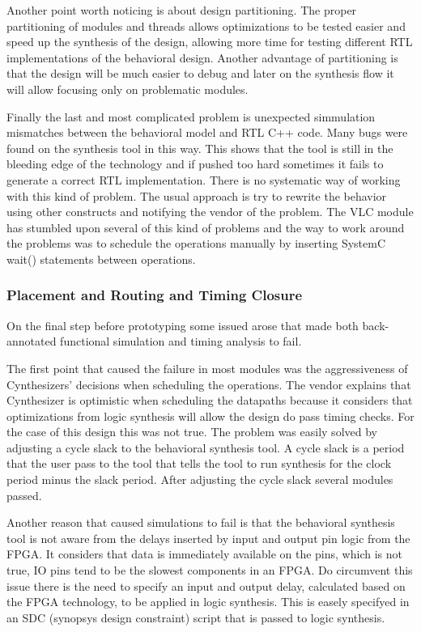 \documentclass[a4paper, 12pt]{article}
\begin{document}
Another point worth noticing is about design partitioning. The proper partitioning of modules and threads allows optimizations to be tested easier and speed up the synthesis of the design, allowing more time for testing different RTL implementations of the behavioral design. Another advantage of partitioning is that the design will be much easier to debug and later on the synthesis flow it will allow focusing only on problematic modules.

Finally the last and most complicated problem is unexpected simmulation mismatches between the behavioral model and RTL C++ code. Many bugs were found on the synthesis tool in this way. This shows that the tool is still in the bleeding edge of the technology and if pushed too hard sometimes it fails to generate a correct RTL implementation. There is no systematic way of working with this kind of problem. The usual approach is try to rewrite the behavior using other constructs and notifying the vendor of the problem. The VLC module has stumbled upon several of this kind of problems and the way to work around the problems was to schedule the operations manually by inserting SystemC wait() statements between operations.

\subsubsection{Placement and Routing and Timing Closure}

On the final step before prototyping some issued arose that made both back-annotated functional simulation and timing analysis to fail.

The first point that caused the failure in most modules was the aggressiveness of Cynthesizers' decisions when scheduling the operations. The vendor explains that Cynthesizer is optimistic when scheduling the datapaths because it considers that optimizations from logic synthesis will allow the design do pass timing checks. For the case of this design this was not true. The problem was easily solved by adjusting a cycle slack to the behavioral synthesis tool. A cycle slack is a period that the user pass to the tool that tells the tool to run synthesis for the clock period minus the slack period.
After adjusting the cycle slack several modules passed.

Another reason that caused simulations to fail is that the behavioral synthesis tool is not aware from the delays inserted by input and output pin logic from the FPGA. It considers that data is immediately available on the pins, which is not true, IO pins tend to be the slowest components in an FPGA. Do circumvent this issue there is the need to specify an input and output delay, calculated based on the FPGA technology, to be applied in logic synthesis. This is easely specifyed in an SDC (synopsys design constraint) script that is passed to logic synthesis.
\end{document}
